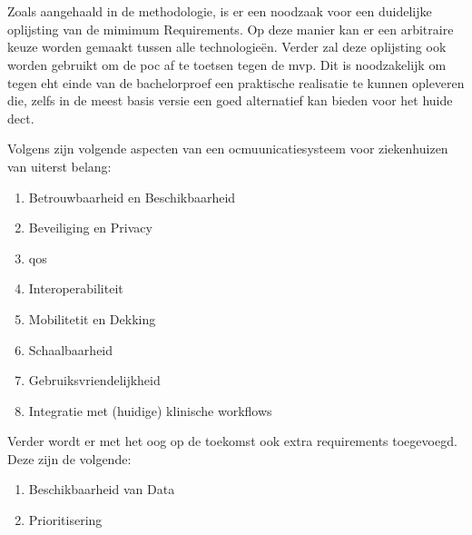 \chapter{}%
\label{ch:minreq}

Zoals aangehaald in de methodologie, is er een noodzaak voor een duidelijke oplijsting van de mimimum Requirements. Op deze manier kan er een arbitraire keuze worden gemaakt tussen alle technologieën. Verder zal deze oplijsting ook worden gebruikt om de \acrshort{poc} af te toetsen tegen de \acrshort{mvp}. Dit is noodzakelijk om tegen eht einde van de bachelorproef een praktische realisatie te kunnen opleveren die, zelfs in de meest basis versie een goed alternatief kan bieden voor het huide \acrshort{dect}.

Volgens \textcite{Coiera2006} zijn volgende aspecten van een ocmuunicatiesysteem voor ziekenhuizen van uiterst belang:

\begin{enumerate}
    \item Betrouwbaarheid en Beschikbaarheid
    \item Beveiliging en Privacy
    \item \acrfull{qos}
    \item Interoperabiliteit
    \item Mobilitetit en Dekking
    \item Schaalbaarheid
    \item Gebruiksvriendelijkheid
    \item Integratie met (huidige) klinische workflows 
\end{enumerate}

Verder wordt er met het oog op de toekomst ook extra requirements toegevoegd. Deze zijn de volgende:

\begin{enumerate}
    \item Beschikbaarheid van Data
    \item Prioritisering
\end{enumerate}

\section{}

\section{}


